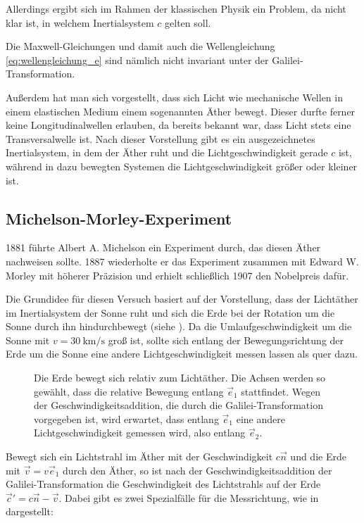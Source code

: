 Allerdings ergibt sich im Rahmen der klassischen Physik ein Problem, da nicht klar ist, in welchem Inertialsystem $c$ gelten soll.

Die Maxwell-Gleichungen und damit auch die Wellengleichung \eqref{eq:wellengleichung_e} sind nämlich nicht invariant unter der Galilei-Transformation.

Außerdem hat man sich vorgestellt, dass sich Licht wie mechanische Wellen in einem elastischen Medium \textendash{} einem sogenannten Äther \textendash{} bewegt. Dieser durfte ferner keine Longitudinalwellen erlauben, da bereits bekannt war, dass Licht stets eine Transversalwelle ist.
Nach dieser Vorstellung gibt es ein ausgezeichnetes Inertialsystem, in dem der Äther ruht und die Lichtgeschwindigkeit gerade $c$ ist, während in dazu bewegten Systemen die Lichtgeschwindigkeit größer oder kleiner ist.




\subsection{Michelson-Morley-Experiment}

1881 führte Albert A. Michelson ein Experiment durch, das diesen Äther nachweisen sollte. 1887 wiederholte er das Experiment zusammen mit Edward W. Morley mit höherer Präzision und erhielt schließlich 1907 den Nobelpreis dafür.

Die Grundidee für diesen Versuch basiert auf der Vorstellung, dass der Lichtäther im Inertialsystem der Sonne ruht und sich die Erde bei der Rotation um die Sonne durch ihn hindurchbewegt (siehe ). Da die Umlaufgeschwindigkeit um die Sonne mit $v=\SI{30}{\kilo\m\per\s}$ groß ist, sollte sich entlang der Bewegungsrichtung der Erde um die Sonne eine andere Lichtgeschwindigkeit messen lassen als quer dazu.

\begin{figure}[htp]
    \centering
    \tfigBewegungDurchLichtaetherA
    \caption{Die Erde bewegt sich relativ zum Lichtäther. Die Achsen werden so gewählt, dass die relative Bewegung entlang $\vec e_1$ stattfindet. Wegen der Geschwindigkeitsaddition, die durch die Galilei-Transformation vorgegeben ist, wird erwartet, dass entlang $\vec e_1$ eine andere Lichtgeschwindigkeit gemessen wird, also entlang $\vec e_2$. }
    \label{fig:bewegung_durch_lichtaetherA}
\end{figure}

Bewegt sich ein Lichtstrahl im Äther mit der Geschwindigkeit $c\vec n$ und die Erde mit $\vec v = v\vec e_1$ durch den Äther, so ist nach der Geschwindigkeitsaddition der Galilei-Transformation die Geschwindigkeit des Lichtstrahls auf der Erde $\vec c'=c\vec n-\vec v$. Dabei gibt es zwei Spezialfälle für die Messrichtung, wie in  dargestellt:

